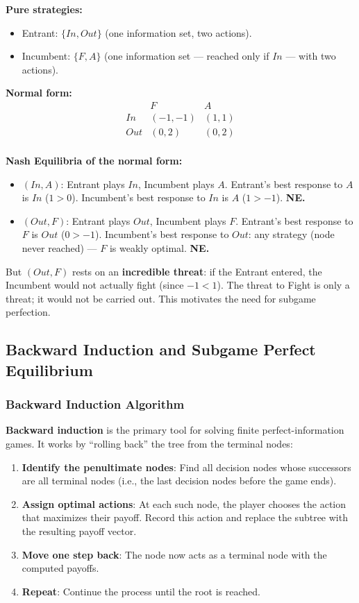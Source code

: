 \documentclass[hidelinks]{article}
\begin{document}
\textbf{Pure strategies:}
\begin{itemize}
    \item Entrant: $\{In, Out\}$ (one information set, two actions).
    \item Incumbent: $\{F, A\}$ (one information set — reached only if $In$ — with two actions).
\end{itemize}

\textbf{Normal form:}
\[
\begin{array}{c|cc}
 & F & A \\
\hline
In & (-1,-1) & (1,1) \\
Out & (0,2) & (0,2) \\
\end{array}
\]

\textbf{Nash Equilibria of the normal form:}
\begin{itemize}
    \item $(In, A)$: Entrant plays $In$, Incumbent plays $A$. Entrant's best response to $A$ is $In$ ($1 > 0$). Incumbent's best response to $In$ is $A$ ($1 > -1$). \textbf{NE.}
    \item $(Out, F)$: Entrant plays $Out$, Incumbent plays $F$. Entrant's best response to $F$ is $Out$ ($0 > -1$). Incumbent's best response to $Out$: any strategy (node never reached) — $F$ is weakly optimal. \textbf{NE.}
\end{itemize}

But $(Out, F)$ rests on an \textbf{incredible threat}: if the Entrant entered, the Incumbent would not actually fight (since $-1 < 1$). The threat to Fight is only a threat; it would not be carried out. This motivates the need for subgame perfection.

\subsection{Backward Induction and Subgame Perfect Equilibrium}

\subsubsection{Backward Induction Algorithm}

\textbf{Backward induction} is the primary tool for solving finite perfect-information games. It works by ``rolling back'' the tree from the terminal nodes:

\begin{enumerate}
    \item \textbf{Identify the penultimate nodes}: Find all decision nodes whose successors are all terminal nodes (i.e., the last decision nodes before the game ends).
    \item \textbf{Assign optimal actions}: At each such node, the player chooses the action that maximizes their payoff. Record this action and replace the subtree with the resulting payoff vector.
    \item \textbf{Move one step back}: The node now acts as a terminal node with the computed payoffs.
    \item \textbf{Repeat}: Continue the process until the root is reached.
\end{enumerate}
\end{document}

